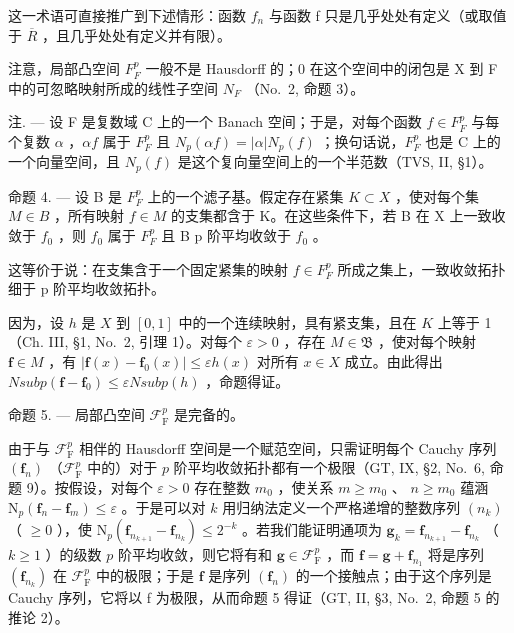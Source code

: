 这一术语可直接推广到下述情形：函数 \(f_{n}\) 与函数 f 只是几乎处处有定义（或取值于 \(\overline{R}\) ，且几乎处处有定义并有限）。

注意，局部凸空间 \(F_{F}^{p}\) 一般不是 Hausdorff 的；0 在这个空间中的闭包是 X 到 F 中的可忽略映射所成的线性子空间 \(N_{F}\) （No.~2, 命题 3）。

注. --- 设 F 是复数域 C 上的一个 Banach 空间；于是，对每个函数 \(f \in F_{F}^{p}\) 与每个复数 \(\alpha\) ，\(\alpha f\) 属于 \(F_{F}^{p}\) 且 \(N_{p}(\alpha f) = |\alpha| N_{p}(f)\) ；换句话说，\(F_{F}^{p}\) 也是 C 上的一个向量空间，且 \(N_{p}(f)\) 是这个复向量空间上的一个半范数（TVS, II, §1）。

命题 4. --- 设 B 是 \(F_{F}^{p}\) 上的一个滤子基。假定存在紧集 \(K \subset X\) ，使对每个集 \(M \in B\) ，所有映射 \(f \in M\) 的支集都含于 K。在这些条件下，若 B 在 X 上一致收敛于 \(f_{0}\) ，则 \(f_{0}\) 属于 \(F_{F}^{p}\) 且 B p 阶平均收敛于 \(f_{0}\) 。

这等价于说：在支集含于一个固定紧集的映射 \(f \in F_{F}^{p}\) 所成之集上，一致收敛拓扑细于 p 阶平均收敛拓扑。

因为，设 \(h\) 是 \(X\) 到 \([0,1]\) 中的一个连续映射，具有紧支集，且在 \(K\) 上等于 1（Ch. III, §1, No.~2, 引理 1）。对每个 \(\varepsilon > 0\) ，存在 \(M \in \mathfrak{B}\) ，使对每个映射 \(\mathbf{f} \in M\) ，有 \(|\mathbf{f}(x) - \mathbf{f}_0(x)| \leqslant \varepsilon h(x)\) 对所有 \(x \in X\) 成立。由此得出 \(N sub p(\mathbf{f} - \mathbf{f}_0) \leqslant \varepsilon N sub p(h)\) ，命题得证。

命题 5. --- 局部凸空间 \(\mathcal{F}_{\mathrm{F}}^{p}\) 是完备的。

由于与 \(\mathcal{F}_{\mathrm{F}}^{p}\) 相伴的 Hausdorff 空间是一个赋范空间，只需证明每个 Cauchy 序列 \((\mathbf{f}_n)\) （\(\mathcal{F}_{\mathrm{F}}^{p}\) 中的）对于 \(p\) 阶平均收敛拓扑都有一个极限（GT, IX, §2, No.~6, 命题 9）。按假设，对每个 \(\varepsilon > 0\) 存在整数 \(m_0\) ，使关系 \(m \geqslant m_0\) 、 \(n \geqslant m_0\) 蕴涵 \(\mathrm{N}_p(\mathbf{f}_n - \mathbf{f}_m) \leqslant \varepsilon\) 。于是可以对 \(k\) 用归纳法定义一个严格递增的整数序列 \((n_k)\) （ \(\geqslant 0\) ），使 \(\mathrm{N}_p(\mathbf{f}_{n_{k+1}} - \mathbf{f}_{n_k}) \leqslant 2^{-k}\) 。若我们能证明通项为 \(\mathbf{g}_k = \mathbf{f}_{n_{k+1}} - \mathbf{f}_{n_k}\) （ \(k \geqslant 1\) ）的级数 \(p\) 阶平均收敛，则它将有和 \(\mathbf{g} \in \mathcal{F}_{\mathrm{F}}^p\) ，而 \(\mathbf{f} = \mathbf{g} + \mathbf{f}_{n_1}\) 将是序列 \((\mathbf{f}_{n_k})\) 在 \(\mathcal{F}_{\mathrm{F}}^p\) 中的极限；于是 \(\mathbf{f}\) 是序列 \((\mathbf{f}_n)\) 的一个接触点；由于这个序列是 Cauchy 序列，它将以 f 为极限，从而命题 5 得证（GT, II, §3, No.~2, 命题 5 的推论 2）。

